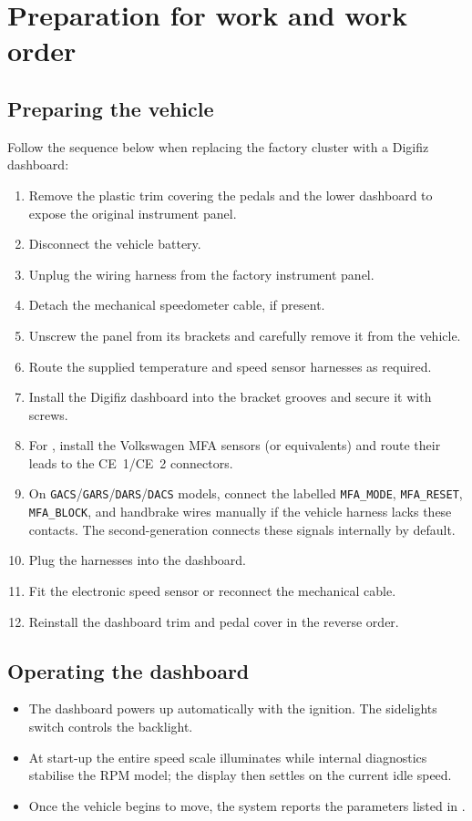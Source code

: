 \chapter{Preparation for work and work order}\label{ch:preparation}

\section{Preparing the vehicle}
Follow the sequence below when replacing the factory cluster with a Digifiz dashboard:
\begin{enumerate}
    \item Remove the plastic trim covering the pedals and the lower dashboard to expose the original instrument panel.
    \item Disconnect the vehicle battery.
    \item Unplug the wiring harness from the factory instrument panel.
    \item Detach the mechanical speedometer cable, if present.
    \item Unscrew the panel from its brackets and carefully remove it from the vehicle.
    \item Route the supplied temperature and speed sensor harnesses as required.
    \item Install the Digifiz dashboard into the bracket grooves and secure it with screws.
    \item For \ReplicaNextLong{}, install the Volkswagen MFA sensors (or equivalents) and route their leads to the CE~1/CE~2 connectors.
    \item On \texttt{GACS}/\texttt{GARS}/\texttt{DARS}/\texttt{DACS} models, connect the labelled \texttt{MFA\_MODE}, \texttt{MFA\_RESET}, \texttt{MFA\_BLOCK}, and handbrake wires manually if the vehicle harness lacks these contacts. The second-generation \ReplicaNextShort{} connects these signals internally by default.
    \item Plug the harnesses into the dashboard.
    \item Fit the electronic speed sensor or reconnect the mechanical cable.
    \item Reinstall the dashboard trim and pedal cover in the reverse order.
\end{enumerate}

\section{Operating the dashboard}
\begin{itemize}
    \item The dashboard powers up automatically with the ignition. The sidelights switch controls the backlight.
    \item At start-up the entire speed scale illuminates while internal diagnostics stabilise the RPM model; the display then settles on the current idle speed.
    \item Once the vehicle begins to move, the system reports the parameters listed in .
\end{itemize}

